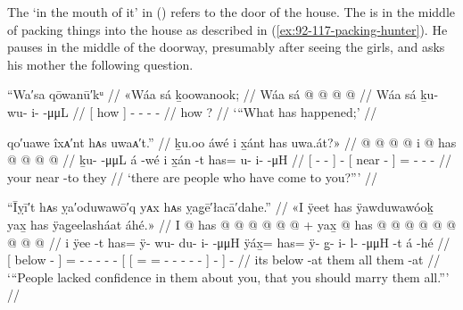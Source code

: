 The  ‘in the mouth of it’ in (\lastx) refers to the door of the house.
The  is in the middle of packing things into the house as described in (\ref{ex:92-117-packing-hunter}).
He pauses in the middle of the doorway, presumably after seeing the girls, and asks his mother the following question.

\ex\label{ex:92-119-whats-happening}%
%
\begingl
	\glpreamble	“Wa′sa qōwanū′kᵘ //
	\glpreamble	«\!Wáa sá ḵoowanook; //
	\gla	{} Wáa sá {}  @ {} @ {} @ {} @ {} //
	\glb	{} Wáa sá {} ḵu- wu- i-  -μμL //
	\glc	{}[ how  {}]
		- - -  - //
	\gld	{} how ? {}  {} {} {} {} //
	\glft	‘“What has happened;’
		//
\endgl
\xe

\ex\label{ex:92-120-people-came-to-you}%
%
\begingl
	\glpreamble	qo′uawe îxᴀ′nt hᴀs uwaᴀ′t.” //
	\glpreamble	ḵu.oo áwé i x̱ánt has uwa.át?\!» //
	\gla	{}  @ {} @ {} @ {} {}  @ {}
		{} i  @ {} {}
		has @  @ {} @ {} @ {} //
	\glb	{} ḵu-  -μμL {} {} á -wé
		{} i x̱án -t {}
		has= u- i-  -μH //
	\glc	{}[ -  - \· {}]  -
		{}[  near - {}]
		= - -  - //
	\gld	{}  {} {} {} {}  {}
		{} your near -to {}
		they  {} {} {} //
	\glft	‘there are people who have come to you?”’
		//
\endgl
\xe

\ex\label{ex:92-121-lack-confidence-marry}%
%
\begingl
	\glpreamble	“Īỵī′t hᴀs ỵa′oduwawō′q yᴀx hᴀs ỵag̣ē′łacā′dahe.” //
	\glpreamble	«\!I ÿeet has ÿawduwawóoḵ yax̱ has ÿag̱eelasháat áhé.\!» //
	\gla	{} I  @ {} {}
		has @  @ {} @ {} @ {} @ {} @ {} +
		{} {} yax̱ @ has @  @ {} @ {} @ {} @ {} @ {} @ {} @ {} {}
		{} {}
		 @ {} //
	\glb	{} i ÿee -t {}
		has= ÿ- wu- du- i-  -μμH
		{} {} ÿáx̱= has= ÿ- {} g̱- i- l-  -μμH {} {} -t {}
		á -hé //
	\glc	{}[  below - {}]
		= - - - -
			 -
		{}[ {}[ = = - \· -
			- -  - \· {}]
			- {}]
		 - //
	\gld	{} its below -at {}
		them  {} {} {} {} {}
		{} {} all them  {} {} {} {} {} {} {}
		{} -at {} 
		 {} //
	\glft	‘“People lacked confidence in them about you, that you should marry them all.”’
		//
\endgl
\xe

